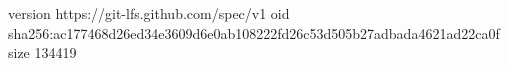 version https://git-lfs.github.com/spec/v1
oid sha256:ac177468d26ed34e3609d6e0ab108222fd26c53d505b27adbada4621ad22ca0f
size 134419

